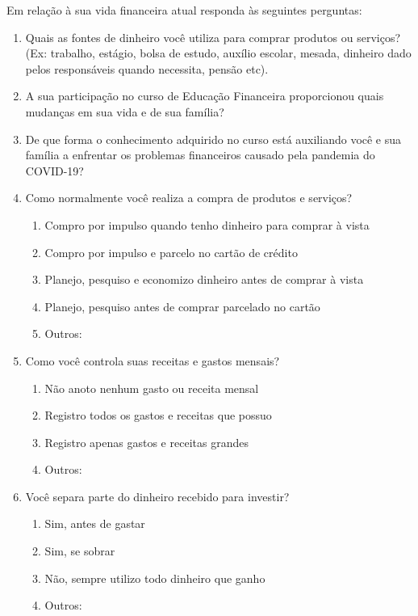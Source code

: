 Em relação à sua vida financeira atual responda às seguintes perguntas:
\begin{enumerate}
   \item Quais as fontes de dinheiro você utiliza para comprar produtos ou serviços? (Ex: trabalho, estágio, bolsa de estudo, auxílio escolar, mesada, dinheiro dado pelos responsáveis quando necessita, pensão etc).
   
   \item A sua participação no curso de Educação Financeira proporcionou quais mudanças em sua vida e de sua família?
   
   \item De que forma o conhecimento adquirido no curso está auxiliando você e sua família a enfrentar os problemas financeiros causado pela pandemia do COVID-19?
   
   \item Como normalmente você realiza a compra de produtos e serviços?
        \begin{enumerate}
            \item Compro por impulso quando tenho dinheiro para comprar à vista
            \item Compro por impulso e parcelo no cartão de crédito
            \item Planejo, pesquiso e economizo dinheiro antes de comprar à vista
            \item Planejo, pesquiso antes de comprar parcelado no cartão
            \item Outros:
        \end{enumerate}
        
    \item Como você controla suas receitas e gastos mensais?
        \begin{enumerate}
            \item Não anoto nenhum gasto ou receita mensal
            \item Registro todos os gastos e receitas que possuo
            \item Registro apenas gastos e receitas grandes
            \item Outros:
        \end{enumerate}
        
    \item Você separa parte do dinheiro recebido para investir?
        \begin{enumerate}
            \item Sim, antes de gastar
            \item Sim, se sobrar
            \item Não, sempre utilizo todo dinheiro que ganho
            \item Outros:
        \end{enumerate}
    

\end{enumerate}
